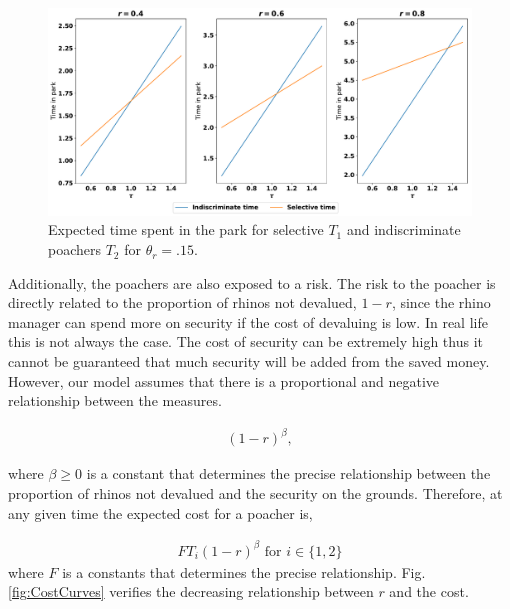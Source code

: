 \documentclass[10pt]{article}
\begin{document}
\begin{figure}[!htbp]
    \begin{center}
        \includegraphics[width=\linewidth]{images/indiscriminate_vs_selective_time.pdf}
        \caption{Expected time spent in the park for selective \(T_1\) and
        indiscriminate poachers \(T_2\) for \(\theta_r=.15\).}\label{fig:indiscriminate_vs_selective_time}
    \end{center}
\end{figure}



Additionally, the poachers are also exposed to a risk. The risk to the poacher is
directly related to the proportion of rhinos not devalued, \(1 - r\), since
the rhino manager can spend more on security if the cost of devaluing is low.
In real life this is not always the case. The cost of security can be extremely
high thus it cannot be guaranteed that much security will be added from the
saved money. However, our model assumes that there is a proportional and negative
relationship between the measures.

\begin{eqnarray}
    \label{eqn:risk}
    (1 - r)^{\beta},
\end{eqnarray}

where \(\beta \geq 0\) is a constant that determines the precise relationship
between the proportion of rhinos not devalued and the security on the grounds.
Therefore, at any given time the expected cost for a poacher is,

\begin{equation}
    \begin{split}
    \label{eqn:cost}
        FT_i(1 - r)^{\beta} \text{ for } i \in \{1, 2\}
    \end{split}
\end{equation}
where \(F\) is a constants that determines the precise relationship. Fig.
\ref{fig:CostCurves} verifies the decreasing relationship between \(r\) and the
cost.
\end{document}
